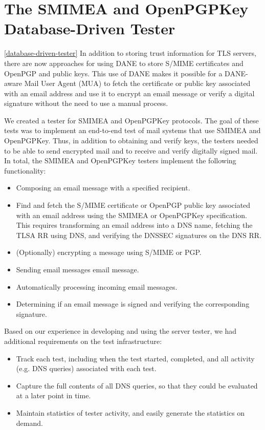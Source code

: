\documentclass[preprint,3p,11pt]{elsarticle}
\begin{document}
\section{The SMIMEA and OpenPGPKey Database-Driven Tester}\ref{database-driven-tester}
In addition to storing trust information for TLS servers, there are
now approaches for using DANE to store S/MIME certificates and OpenPGP
and public keys. This use of DANE makes it possible for a DANE-aware
Mail User Agent (MUA) to fetch the certificate or public key associated
with an email address and use it to encrypt an email message or verify
a digital signature without the need to use a manual
process.

We created a tester for SMIMEA and OpenPGPKey protocols. The goal of
these tests was to implement an end-to-end test of mail systems that
use SMIMEA and OpenPGPKey. Thus, in addition to obtaining and verify
keys, the testers needed to be able to send encrypted mail and to
receive and verify digitally signed mail. In total, the 
SMIMEA and OpenPGPKey testers implement the following functionality:

\begin{itemize}
\item Composing an email message with a specified recipient. 
\item Find and fetch the S/MIME certificate or OpenPGP public
  key associated with an email address using the SMIMEA or OpenPGPKey
  specification. This requires transforming an email address into a
  DNS name, fetching the TLSA RR using DNS, and verifying the DNSSEC
  signatures on the DNS RR.
\item (Optionally) encrypting a message using S/MIME or PGP.
\item Sending email messages email message. 
\item Automatically processing incoming email messages.
\item Determining if an email message is signed and verifying the
  corresponding signature. 
\end{itemize}

\noindent Based on our experience in developing and using the server tester, we
had additional requirements on the test infrastructure:

\begin{itemize}
\item Track each test, including when the test started, completed, and
  all activity (e.g. DNS queries) associated with each test.
\item Capture the full contents of all DNS queries, so that they could
  be evaluated at a later point in time.
\item Maintain statistics of tester activity, and easily generate the
  statistics on demand.
\end{itemize}
\end{document}
